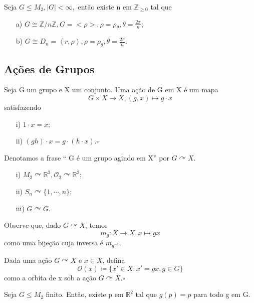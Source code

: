 \documentclass[algebra_notes.tex]{subfiles}
\begin{document}
\begin{crl*}
	Seja \(G\leq M_{2}, |G| < \infty,\) então existe n em \(\mathbb{Z}_{\geq 0}\) tal que
	\begin{itemize}
		\item[a)] \(G\cong{\mathbb{Z}/n \mathbb{Z}}, G = <\rho >, \rho =\rho _{\theta }, \theta =\frac{2\pi }{n}\);
		\item[b)] \(G\cong{D_{n}}=\left< r, \rho  \right>, \rho =\rho _{\theta }, \theta =\frac{2\pi }{n}\).
	\end{itemize}
\end{crl*}
\subsection{Ações de Grupos}
\begin{def*}
	Seja G um grupo e X um conjunto. Uma ação de G em X é um mapa
	\[
		G\times{X}\rightarrow X, (g,x)\mapsto g \cdot x
	\]
	satisfazendo
	\begin{itemize}
		\item[i)] \(1 \cdot x = x;\)
		\item[ii)] \((gh)\cdot x= g \cdot (h \cdot x). \square\)
	\end{itemize}
\end{def*}
Denotamos a frase `` G é um grupo agindo em X'' por \(G \curvearrowright X\).
\begin{example*}
	\begin{itemize}
		\item[i)] \(M_{2} \curvearrowright \mathbb{R}^{2}, \mathcal{O}_{2} \curvearrowright \mathbb{R}^{2}\);
		\item[ii)] \(S_{n}\curvearrowright \{1, \cdots, n\}\);
		\item[iii)] \(G \curvearrowright G\).
	\end{itemize}
\end{example*}
Observe que, dado \(G \curvearrowright X\), temos
\[
	m_{g}:X\rightarrow X, x\mapsto gx
\]
como uma bijeção cuja inversa é \(m_{g^{-1}}\).
\begin{def*}
	Dada uma ação \(G \curvearrowright X\) e \(x\in X\), defina
	\[
		\mathcal{O}(x)\coloneqq \{x'\in X: x'=gx, g\in G\}
	\]
	como a orbita de x sob a ação \(G \curvearrowright X.\square\)
\end{def*}
\hypertarget{fixed_pt}{
	\begin{theorem*}
		Seja \(G\leq M_{2}\) finito. Então, existe p em \(\mathbb{R}^{2}\) tal que
		\(g(p)=p\) para todo g em G.
	\end{theorem*}
}
\end{document}
